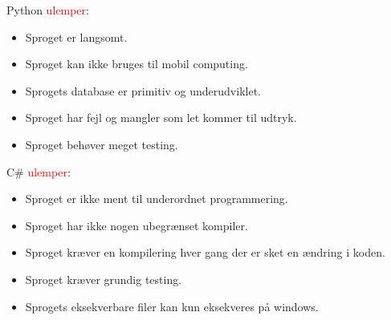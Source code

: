 \documentclass[class=report, crop=false]{standalone}
\begin{document}
        \begin{multicols}{2}
        \raggedcolumns
        \begin{tcolorbox}
        \noindent Python \textcolor{red}{ulemper}:
        \begin{itemize}
            \setlength{\itemsep}{0pt}
            \setlength{\parskip}{0pt}
            \item Sproget er langsomt.
            \item Sproget kan ikke bruges til mobil computing.
            \item Sprogets database er primitiv og underudviklet.
            \item Sproget har fejl og mangler som let kommer til udtryk.
            \item Sproget behøver meget testing.
        \end{itemize}
        \end{tcolorbox}
        \columnbreak

        \begin{tcolorbox}
        \noindent C\# \textcolor{red}{ulemper}:
        \begin{itemize}
            \setlength{\itemsep}{0pt}
            \setlength{\parskip}{0pt}
            \item Sproget er ikke ment til underordnet programmering.
            \item Sproget har ikke nogen ubegrænset kompiler.
            \item Sproget kræver en kompilering hver gang der er sket en ændring i koden.
            \item Sproget kræver grundig testing.
            \item Sprogets eksekverbare filer kan kun eksekveres på windows.
        \end{itemize}
        \end{tcolorbox}
        \end{multicols}
    
\end{document}
